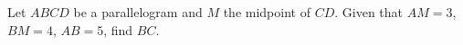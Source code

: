 Let $ABCD$ be a parallelogram and $M$ the midpoint of $CD$. Given that $AM=3$, $BM=4$, $AB=5$, find $BC$.
